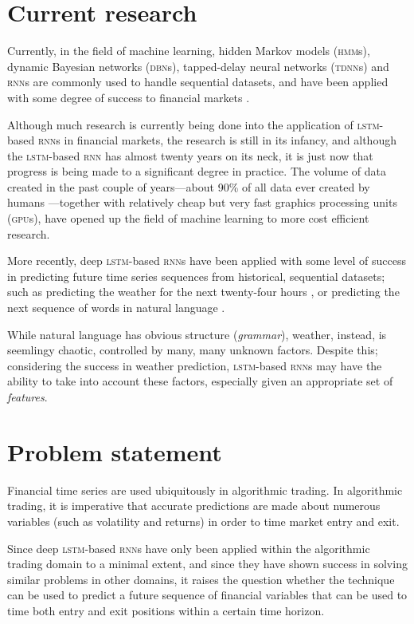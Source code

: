 \section{Current research}
Currently, in the field of machine learning, hidden Markov models
(\textsc{hmm}s), dynamic Bayesian networks (\textsc{dbn}s), tapped-delay neural
networks (\textsc{tdnn}s) and \textsc{rnn}s are commonly used to handle
sequential datasets, and have been applied with some degree of success to
financial markets \citep{saad1998,kita2012,zhang2004}.

Although much research is currently being done into the application of
\textsc{lstm}-based \textsc{rnn}s in financial markets, the research is still in
its infancy, and although the \textsc{lstm}-based \textsc{rnn} has almost twenty
years on its neck, it is just now that progress is being made to a significant
degree in practice.  The volume of data created in the past couple of
years---about 90\% of all data ever created by humans
\citep*{devakunchari2014}---together with relatively cheap but very fast
graphics processing units (\textsc{gpu}s), have opened up the field of machine
learning to more cost efficient research.

More recently, deep \textsc{lstm}-based \textsc{rnn}s have been applied with
some level of success in predicting future time series sequences from
historical, sequential datasets; such as predicting the weather for the next
twenty-four hours \citep*{zaytar2016}, or predicting the next sequence of words
in natural language \citep*{quoc2014}.

While natural language has obvious structure (\textit{grammar}), weather,
instead, is seemlingy chaotic, controlled by many, many unknown factors.
Despite this; considering the success in weather prediction, \textsc{lstm}-based
\textsc{rnn}s may have the ability to take into account these factors,
especially given an appropriate set of \textit{features}.

\section{Problem statement}
Financial time series are used ubiquitously in algorithmic trading.  In
algorithmic trading, it is imperative that accurate predictions are made about
numerous variables (such as volatility and returns) in order to time market
entry and exit.

Since deep \textsc{lstm}-based \textsc{rnn}s have only been applied within the
algorithmic trading domain to a minimal extent, and since they have shown
success in solving similar problems in other domains, it raises the question
whether the technique can be used to predict a future sequence of financial
variables that can be used to time both entry and exit positions within a
certain time horizon.

